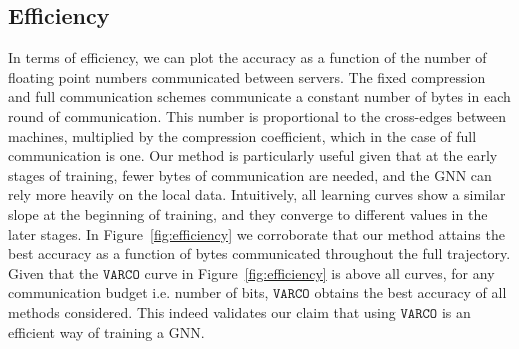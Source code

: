 \documentclass[lettersize,journal]{IEEEtran}
\newcommand{\algo}{\texttt{VARCO}}
\begin{document}
\subsection{Efficiency}
In terms of efficiency, we can plot the accuracy as a function of the number of floating point numbers communicated between servers. The fixed compression and full communication schemes communicate a constant number of bytes in each round of communication. This number is proportional to the cross-edges between machines, multiplied by the compression coefficient, which in the case of full communication is one. 
Our method is particularly useful given that at the early stages of training, fewer bytes of communication are needed, and the GNN can rely more heavily on the local data. Intuitively, all learning curves show a similar slope at the beginning of training, and they converge to different values in the later stages. 
In Figure~\ref{fig:efficiency} we corroborate that our method attains the best accuracy as a function of bytes communicated throughout the full trajectory. Given that the $\algo$ curve in Figure~\ref{fig:efficiency} is above all curves, for any communication budget i.e. number of bits, $\algo$ obtains the best accuracy of all methods considered. This indeed validates our claim that using $\algo$ is an efficient way of training a GNN. 
\end{document}
